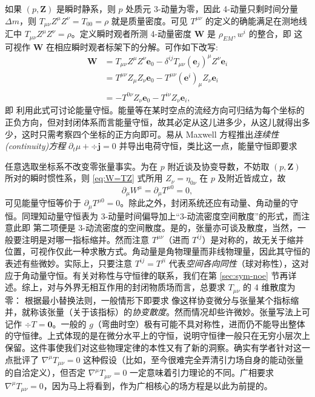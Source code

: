 如果 $(p,\bm Z)$ 是瞬时静系，则 $p$ 处质元 3-动量为零，因此 4-动量只剩时间分量 $\Delta m$，则 $T_{\mu\nu}Z^\mu Z^\nu=T_{00}=\rho$ 就是质量密度。可见 $T^{\mu\nu}$ 的定义的确能满足在测地线汇中 $T_{\mu\nu}Z^\mu Z^\nu=\rho$。定义瞬时观者所测 4-动量密度 $\bm W$ 是 $\rho_{EM},w^i$ 的整合，即
这可视作 $\bm W$ 在相应瞬时观者标架下的分解。可作如下改写:
\begin{align*}
    \bm W
    &=T_{\mu\nu}Z^\mu Z^\nu \bm e_0-\delta^{ij}T_{\mu\nu}(\bm e_j)^\mu Z^\nu\bm e_i\\
    &=T^{\mu\nu}Z_\mu Z_\nu \bm e_0-T^{\mu\nu}(\bm e^i)_\mu Z_\nu\bm e_i\\
    &=-T^{0\nu}Z_\nu\bm e_0-T^{i\nu}Z_\nu\bm e_i,
\end{align*}
即
利用此式可讨论能量守恒。能量等在某时空点的流经方向可归结为每个坐标的正负方向，但对封闭体系而言能量守恒，故其必定从这儿进多少，从这儿就得出多少，这时只需考察四个坐标的正方向即可。易从 Maxwell 方程推出\textit{连续性(continuity)方程} $\partial_t\mu+\div\bm j=0$ 并导出电荷守恒，类比这一点，能量守恒即要求

任意选取坐标系不改变零张量事实。为在 $p$ 附近谈及协变导数，不妨取 $(p,\bm Z)$ 所对的瞬时惯性系，则 \eqref{eq:W=TZ} 式所用 $Z_\nu=\eta_{0\nu}$ 在 $p$ 及附近皆成立，故
\[
    \partial_\mu W^\mu=\partial_\mu T^{\mu 0}=0,
\]
可见能量守恒等价于 $\partial_\mu T^{\mu 0}=0$。除此之外，封闭系统还应有动量、角动量的守恒。同理知动量守恒表为 3-动量时间偏导加上“3-动流密度空间散度”的形式，而注意此即
第二项便是 3-动流密度的空间散度。是的，张量亦可谈及散度，当然，一般要注明是对哪一指标缩并。然而注意 $T^{\mu\nu}$（进而 $T^{ij}$）是对称的，故无关于缩并位置，可视作仅此一种求散方式。角动量是角物理量而非线物理量，因此其守恒的表述有些微妙。实际上，只要注意 $T^{ij}=T^{ji}$ 代表\textit{空间各向同性}（球对称性），这对应于角动量守恒。有关对称性与守恒律的联系，我们在第 \ref{sec:sym-noe} 节再详述。综上，对与外界无相互作用的封闭物质场而言，总要求 $T_{\mu\nu}$ 的 4 维散度为零：
根据最小替换法则，一般情形下即要求
像这样协变微分与张量某个指标缩并，就称该张量（关于该指标）的\textit{协变散度}。然而情况却些许微妙。张量写法上可记作 $\div T=\bm 0$。一般的 $g$（弯曲时空）极有可能不具对称性，进而仍不能导出整体的守恒律。上式体现的是在微分水平上的守恒，说明守恒律一般只在无穷小层次上保留。这件事使我们对这些物理定律的本性又有了新的洞察。确实有学者针对这一点批评了 $\nabla^\mu T_{\mu\nu}=0$ 这种假设（比如，至今很难完全弄清引力场自身的能动张量的自洽定义），但否定 $\nabla^\mu T_{\mu\nu}=0$ 一定意味着引力理论的不同。广相要求 $\nabla^\mu T_{\mu\nu}=0$，因为马上将看到，作为广相核心的场方程是以此为前提的。

